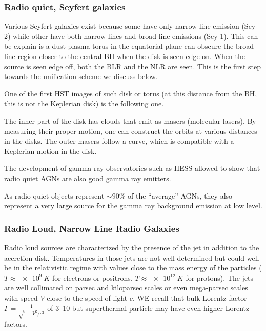 \documentclass[10pt,a4paper,english]{article}
\begin{document}
\subsubsection{Radio quiet, Seyfert galaxies}

Various Seyfert galaxies exist because some have only narrow line emission (Sey
2) while other have both narrow lines and broad line emissions (Sey 1). This
can be explain is a dust-plasma torus in the equatorial plane can obscure the
broad line region closer to the central BH when the disk is seen edge on. When
the source is seen edge off, both the BLR and the NLR are seen. This is the
first step towards the unification scheme we discuss below.

One of the first HST images of such disk or torus (at this distance from the
BH, this is not the Keplerian disk) is the following one. 

The inner part of the disk has  clouds that emit as masers (molecular
lasers). By measuring their proper motion, one can construct the orbits at
various distances in the disks. The outer masers follow a curve, which is
compatible with a Keplerian motion in the disk.

The development of gamma ray observatories such as HESS allowed to show that
radio quiet AGNs are also good gamma ray emitters.


As radio quiet objects represent $\sim 90\%$ of the ``average'' AGNs, they also
represent a very large source for the gamma ray background emission at low
level.

\subsubsection{Radio Loud, Narrow Line Radio Galaxies}

Radio loud sources are characterized by the presence of the jet in addition to
the accretion disk. Temperatures in those jets are not well determined but
could well be in the relativistic regime with values close to the mass energy
of the particles ($T \approx \SI{e9}{K}$ for electrons or positrons, $T\approx
\SI{e12}{K}$ for protons). The jets are well collimated on parsec and
kiloparsec scales or even mega-parsec scales with speed $V$ close to the speed
of light $c$. WE recall that bulk Lorentz factor $\Gamma = \frac{1}{\sqrt{1 -
V^2/c^2}}$ of \numrange{3}{10} but superthermal particle may have even higher
Lorentz factors.
\end{document}

